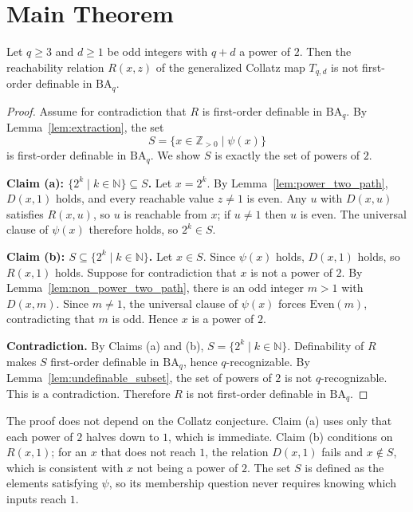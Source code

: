 \documentclass[runningheads]{llncs}
\begin{document}
\section{Main Theorem}
\label{sec:main}

\begin{theorem}\label{thm:main}
Let $q \ge 3$ and $d \ge 1$ be odd integers with $q+d$ a power of $2$.
Then the reachability relation $R(x,z)$ of the generalized Collatz map
$T_{q,d}$ is not first-order definable in $\mathrm{BA}_q$.
\end{theorem}
\begin{proof}
Assume for contradiction that $R$ is first-order definable in
$\mathrm{BA}_q$. By Lemma~\ref{lem:extraction}, the set
\[
S = \{x \in \mathbb{Z}_{>0} \mid \psi(x)\}
\]
is first-order definable in $\mathrm{BA}_q$. We show $S$ is exactly the
set of powers of $2$.

\medskip
\noindent\textbf{Claim (a): $\{2^k \mid k \in \mathbb{N}\} \subseteq S$.}
Let $x = 2^k$. By Lemma~\ref{lem:power_two_path}, $D(x,1)$ holds, and
every reachable value $z \ne 1$ is even. Any $u$ with $D(x,u)$ satisfies
$R(x,u)$, so $u$ is reachable from $x$; if $u \ne 1$ then $u$ is even.
The universal clause of $\psi(x)$ therefore holds, so $2^k \in S$.

\medskip
\noindent\textbf{Claim (b): $S \subseteq \{2^k \mid k \in \mathbb{N}\}$.}
Let $x \in S$. Since $\psi(x)$ holds, $D(x,1)$ holds, so $R(x,1)$ holds.
Suppose for contradiction that $x$ is not a power of $2$. By
Lemma~\ref{lem:non_power_two_path}, there is an odd integer $m > 1$ with
$D(x,m)$. Since $m \ne 1$, the universal clause of $\psi(x)$ forces
$\mathrm{Even}(m)$, contradicting that $m$ is odd. Hence $x$ is a power
of $2$.

\medskip
\noindent\textbf{Contradiction.}
By Claims (a) and (b), $S = \{2^k \mid k \in \mathbb{N}\}$. Definability
of $R$ makes $S$ first-order definable in $\mathrm{BA}_q$, hence
$q$-recognizable. By Lemma~\ref{lem:undefinable_subset}, the set of
powers of $2$ is not $q$-recognizable. This is a contradiction.
Therefore $R$ is not first-order definable in $\mathrm{BA}_q$.
\end{proof}

\begin{remark}
The proof does not depend on the Collatz conjecture. Claim (a) uses only
that each power of $2$ halves down to $1$, which is immediate. Claim (b)
conditions on $R(x,1)$; for an $x$ that does not reach $1$, the relation
$D(x,1)$ fails and $x \notin S$, which is consistent with $x$ not being
a power of $2$. The set $S$ is defined as the elements satisfying
$\psi$, so its membership question never requires knowing which inputs
reach $1$.
\end{remark}
\end{document}
